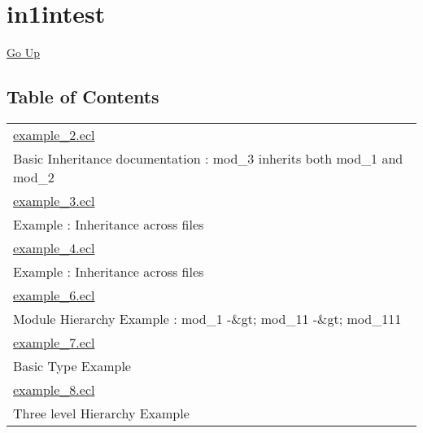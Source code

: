 \chapter*{\color{headtoc} in1intest}
\hypertarget{ecldoc:toc:root/intest/in1intest}{}
\hyperlink{ecldoc:toc:}{Go Up}


\section*{Table of Contents}
{\renewcommand{\arraystretch}{1.5}
\begin{longtable}{|p{\textwidth}|}
\hline
\hyperlink{ecldoc:toc:intest.in1intest.example_2}{example\_2.ecl} \\
Basic Inheritance documentation : mod\_3 inherits both mod\_1 and mod\_2 \\
\hline
\hyperlink{ecldoc:toc:intest.in1intest.example_3}{example\_3.ecl} \\
Example : Inheritance across files \\
\hline
\hyperlink{ecldoc:toc:intest.in1intest.example_4}{example\_4.ecl} \\
Example : Inheritance across files \\
\hline
\hyperlink{ecldoc:toc:intest.in1intest.example_6}{example\_6.ecl} \\
Module Hierarchy Example : mod\_1 -\&gt; mod\_11 -\&gt; mod\_111 \\
\hline
\hyperlink{ecldoc:toc:intest.in1intest.example_7}{example\_7.ecl} \\
Basic Type Example \\
\hline
\hyperlink{ecldoc:toc:intest.in1intest.example_8}{example\_8.ecl} \\
Three level Hierarchy Example \\
\hline
\end{longtable}
}







